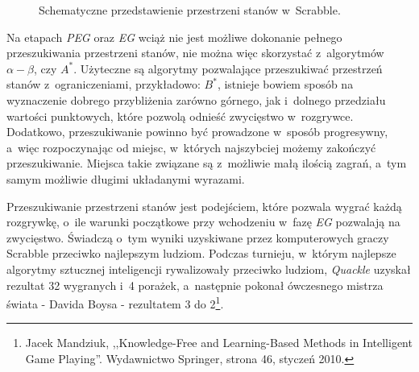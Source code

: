 \documentclass[a4paper,twocolumn,12pt]{article}
\begin{document}
\begin{figure}[ht!]
	\begin{center}
			\caption{Schematyczne przedstawienie przestrzeni stanów w~Scrabble.}
			\label{fig:state_space}
	\end{center}
\end{figure}

Na etapach \emph{PEG} oraz \emph{EG} wciąż nie jest możliwe dokonanie pełnego przeszukiwania przestrzeni stanów, nie można więc skorzystać z~algorytmów $\alpha - \beta$, czy $A^{*}$. Użyteczne są algorytmy pozwalające przeszukiwać przestrzeń stanów z~ograniczeniami, przykładowo: $B^{*}$, istnieje bowiem sposób na wyznaczenie dobrego przybliżenia zarówno górnego, jak i~dolnego przedziału wartości punktowych, które pozwolą odnieść zwycięstwo w~rozgrywce. Dodatkowo, przeszukiwanie powinno być prowadzone w~sposób progresywny, a~więc rozpoczynając od miejsc, w~których najszybciej możemy zakończyć przeszukiwanie. Miejsca takie związane są z~możliwie małą ilością zagrań, a~tym samym możliwie długimi układanymi wyrazami.

Przeszukiwanie przestrzeni stanów jest podejściem, które pozwala wygrać każdą rozgrywkę, o~ile warunki początkowe przy wchodzeniu w~fazę \emph{EG} pozwalają na zwycięstwo. Świadczą o~tym wyniki uzyskiwane przez komputerowych graczy Scrabble przeciwko najlepszym ludziom. Podczas turnieju, w~którym najlepsze algorytmy sztucznej inteligencji rywalizowały przeciwko ludziom, \emph{Quackle} uzyskał rezultat 32 wygranych i~4 porażek, a~następnie pokonał ówczesnego mistrza świata - Davida Boysa - rezultatem 3 do 2\footnote{Jacek Mandziuk, ,,Knowledge-Free and Learning-Based Methods in Intelligent Game Playing''. Wydawnictwo Springer, strona 46, styczeń 2010.}.
\end{document}
